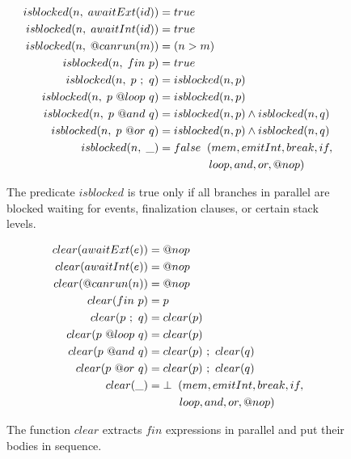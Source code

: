 \begin{figure}
{\small
\begin{align*}
  isblocked(n, \1 awaitExt(id)) &= true                                   \\
  isblocked(n, \1 awaitInt(id)) &= true                                   \\
  isblocked(n, \1 @canrun(m))   &= (n > m)                                \\
  isblocked(n, \1 fin~p)        &= true                                   \\
  isblocked(n, \1 p~;~q)        &= isblocked(n,p)                         \\
  isblocked(n, \1 p~@loop~q)    &= isblocked(n,p)                         \\
  isblocked(n, \1 p~@and~q)     &= isblocked(n,p) \wedge isblocked(n,q)   \\
  isblocked(n, \1 p~@or~q)      &= isblocked(n,p) \wedge isblocked(n,q)   \\
  isblocked(n, \1 \_)           &= false \2 (mem,emitInt,break,if,        \\
                                & \5\5\5\1 loop,and,or,@nop)   %
\end{align*}
}
\caption{
The predicate $isblocked$ is true only if all branches in parallel are blocked
waiting for events, finalization clauses, or certain stack levels.
\label{fig.isblocked}
}
\end{figure}

\begin{figure}[b]
{\small
\begin{align*}
  clear( awaitExt(e) ) &= @nop                  \\
  clear( awaitInt(e) ) &= @nop                  \\
  clear( @canrun(n) )  &= @nop                  \\
  clear( fin~p )       &= p                     \\
  clear( p~;~q )       &= clear(p)              \\
  clear( p~@loop~q )   &= clear(p)              \\
  clear( p~@and~q )    &= clear(p)~;~clear(q)   \\
  clear( p~@or~q )     &= clear(p)~;~clear(q)   \\
  clear( \_ )          &= \bot \2 (mem,emitInt,break,if, \\
                                  & \5\5 loop,and,or,@nop) %
\end{align*}
}
\caption{
The function $clear$ extracts $fin$ expressions in parallel and put their 
bodies in sequence.
\label{fig.formal.clear}
}
\end{figure}

